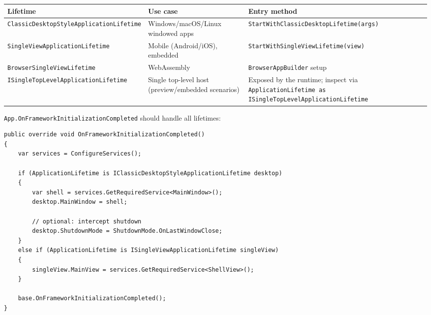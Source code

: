 \begin{longtable}[]{@{}
  >{\raggedright\arraybackslash}p{}
  >{\raggedright\arraybackslash}p{}
  >{\raggedright\arraybackslash}p{}@{}}
\toprule\noalign{}
\begin{minipage}[b]{\linewidth}\raggedright
Lifetime
\end{minipage} & \begin{minipage}[b]{\linewidth}\raggedright
Use case
\end{minipage} & \begin{minipage}[b]{\linewidth}\raggedright
Entry method
\end{minipage} \\
\midrule\noalign{}
\endhead
\bottomrule\noalign{}
\endlastfoot
\passthrough{\lstinline!ClassicDesktopStyleApplicationLifetime!} &
Windows/macOS/Linux windowed apps &
\passthrough{\lstinline!StartWithClassicDesktopLifetime(args)!} \\
\passthrough{\lstinline!SingleViewApplicationLifetime!} & Mobile
(Android/iOS), embedded &
\passthrough{\lstinline!StartWithSingleViewLifetime(view)!} \\
\passthrough{\lstinline!BrowserSingleViewLifetime!} & WebAssembly &
\passthrough{\lstinline!BrowserAppBuilder!} setup \\
\passthrough{\lstinline!ISingleTopLevelApplicationLifetime!} & Single
top-level host (preview/embedded scenarios) & Exposed by the runtime;
inspect via
\passthrough{\lstinline!ApplicationLifetime as ISingleTopLevelApplicationLifetime!} \\
\end{longtable}

\passthrough{\lstinline!App.OnFrameworkInitializationCompleted!} should
handle all lifetimes:

\begin{lstlisting}
public override void OnFrameworkInitializationCompleted()
{
    var services = ConfigureServices();

    if (ApplicationLifetime is IClassicDesktopStyleApplicationLifetime desktop)
    {
        var shell = services.GetRequiredService<MainWindow>();
        desktop.MainWindow = shell;

        // optional: intercept shutdown
        desktop.ShutdownMode = ShutdownMode.OnLastWindowClose;
    }
    else if (ApplicationLifetime is ISingleViewApplicationLifetime singleView)
    {
        singleView.MainView = services.GetRequiredService<ShellView>();
    }

    base.OnFrameworkInitializationCompleted();
}
\end{lstlisting}

